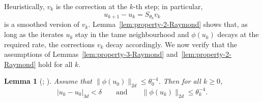 \documentclass[11pt]{amsart}
\newtheorem{lemma}[theorem]{Lemma}
\begin{document}
Heuristically, $v_k$ is the correction at the $k$-th step; in particular,
\[
u_{k+1}-u_k = S_{\theta_k}v_k
\]
is a smoothed version of $v_k$. Lemma~\ref{lem:property-2-Raymond} shows that, as long as the
iterates $u_k$ stay in the tame neighbourhood and $\phi(u_k)$ decays at the required rate, the
corrections $v_k$ decay accordingly. We now verify that the assumptions of
Lemmas~\ref{lem:property-3-Raymond} and~\ref{lem:property-2-Raymond} hold for all $k$.

\begin{lemma}[{\cite[Lemma~1(i)]{Raymond1989}}; {\cite[Theorem~A.11]{DonaldsonLehmann2024}}]
	\label{lem:property-1-Raymond}
	Assume that $\|\phi(u_0)\|_{2d}\le \theta_0^{-4}$. Then for all $k\ge 0$,
	\[
	|u_k-u_0|_{3d}<\delta
	\qquad\text{and}\qquad
	\|\phi(u_k)\|_{2d}\le \theta_k^{-4}.
	\]
\end{lemma}
\end{document}

